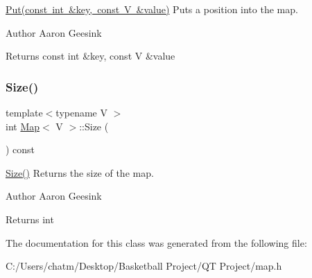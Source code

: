 \mbox{\hyperlink{class_map_acc047d86867d1093a12c152aaa99dff2}{Put(const int \&key, const V \&value)}} Puts a position into the map. 

\begin{DoxyAuthor}{Author}
Aaron Geesink 
\end{DoxyAuthor}
\begin{DoxyReturn}{Returns}
const int \&key, const V \&value 
\end{DoxyReturn}
\mbox{\label{class_map_a0086c1ab7748d1517aaf8618043dd7f3}} 
\subsubsection{\texorpdfstring{Size()}{Size()}}
{\footnotesize\ttfamily template$<$typename V $>$ \\
int \mbox{\hyperlink{class_map}{Map}}$<$ V $>$\+::Size (\begin{DoxyParamCaption}{ }\end{DoxyParamCaption}) const}



\mbox{\hyperlink{class_map_a0086c1ab7748d1517aaf8618043dd7f3}{Size()}} Returns the size of the map. 

\begin{DoxyAuthor}{Author}
Aaron Geesink 
\end{DoxyAuthor}
\begin{DoxyReturn}{Returns}
int 
\end{DoxyReturn}


The documentation for this class was generated from the following file\+:\begin{DoxyCompactItemize}
\item 
C\+:/\+Users/chatm/\+Desktop/\+Basketball Project/\+Q\+T Project/map.\+h\end{DoxyCompactItemize}
